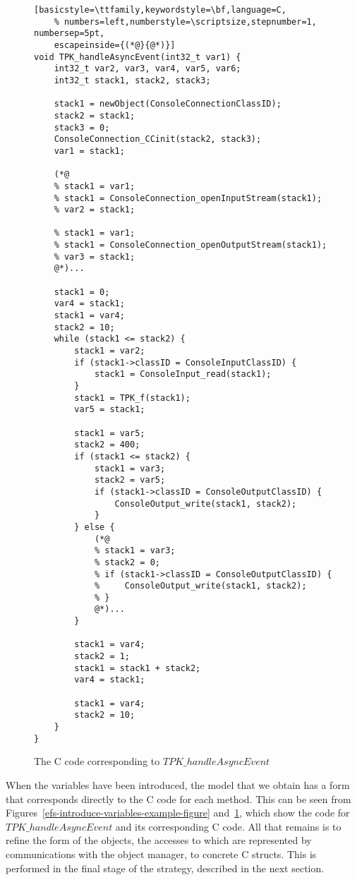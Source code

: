 \begin{figure}[tp!]
  \centering
  \setlength{\zedtab}{0.5cm}
  \setlength{\zedindent}{0pt}
  \setlength{\zedleftsep}{0pt}
  \setlength{\abovedisplayskip}{0pt}
  \setlength{\belowdisplayskip}{0pt}
  \setlength{\abovedisplayshortskip}{0pt}
  \setlength{\belowdisplayshortskip}{0pt}
  \begin{lstlisting}[basicstyle=\ttfamily,keywordstyle=\bf,language=C,
    % numbers=left,numberstyle=\scriptsize,stepnumber=1, numbersep=5pt,
    escapeinside={(*@}{@*)}]
void TPK_handleAsyncEvent(int32_t var1) {
    int32_t var2, var3, var4, var5, var6;
    int32_t stack1, stack2, stack3;

    stack1 = newObject(ConsoleConnectionClassID);
    stack2 = stack1;
    stack3 = 0;
    ConsoleConnection_CCinit(stack2, stack3);
    var1 = stack1;
    
    (*@
    % stack1 = var1;
    % stack1 = ConsoleConnection_openInputStream(stack1);
    % var2 = stack1;
    
    % stack1 = var1;
    % stack1 = ConsoleConnection_openOutputStream(stack1);
    % var3 = stack1;
    @*)...

    stack1 = 0;
    var4 = stack1;
    stack1 = var4;
    stack2 = 10;
    while (stack1 <= stack2) {
        stack1 = var2;
        if (stack1->classID = ConsoleInputClassID) {
            stack1 = ConsoleInput_read(stack1);
        }
        stack1 = TPK_f(stack1);
        var5 = stack1;
        
        stack1 = var5;
        stack2 = 400;
        if (stack1 <= stack2) {  
            stack1 = var3;
            stack2 = var5;
            if (stack1->classID = ConsoleOutputClassID) {
                ConsoleOutput_write(stack1, stack2);
            }
        } else {
            (*@
            % stack1 = var3;
            % stack2 = 0;
            % if (stack1->classID = ConsoleOutputClassID) {
            %     ConsoleOutput_write(stack1, stack2);
            % }
            @*)...
        }
          
        stack1 = var4;
        stack2 = 1;
        stack1 = stack1 + stack2;
        var4 = stack1;

        stack1 = var4;
        stack2 = 10;
    }
}
\end{lstlisting}
  \caption{The C code corresponding to $TPK\_handleAsyncEvent$}
  \label{efs-introduce-variables-c-code-figure}
\end{figure}

When the variables have been introduced, the model that we obtain has
a form that corresponds directly to the C code for each method.
This can be seen from
Figures~\ref{efs-introduce-variables-example-figure}
and~\ref{efs-introduce-variables-c-code-figure}, which show the
\Circus{} code for $TPK\_handleAsyncEvent$ and its corresponding C
code.
All that remains is to refine the form of the objects, the accesses to
which are represented by communications with the object manager, to
concrete C structs.
This is performed in the final stage of the strategy, described in the
next section.

